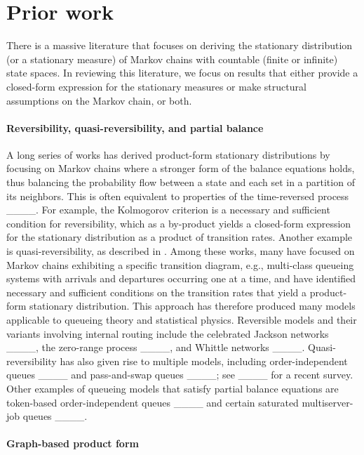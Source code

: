\section{Prior work}
\label{sec:prior-work}

There is a massive literature that focuses on deriving
the stationary distribution (or a stationary measure)
of Markov chains with countable
(finite or infinite) state spaces.
In reviewing this literature, we focus on results that
either provide a closed-form expression for the stationary measures
or make structural assumptions on the Markov chain,
or both.

\paragraph*{Reversibility, quasi-reversibility, and partial balance}

A long series of works has derived product-form stationary distributions
by focusing on Markov chains
where a stronger form of the balance equations holds,
thus balancing the probability flow between a state and each set
in a partition of its neighbors.
This is often equivalent to
properties of the time-reversed process ____.
For example, the Kolmogorov criterion \cite[Theorem~2.8]{serfozo}
is a necessary and sufficient condition for reversibility,
which as a by-product yields a closed-form expression for the stationary distribution
as a product of transition rates.
Another example is quasi-reversibility,
as described in \cite[Chapter~3]{kelly}.
Among these works, many have focused on Markov chains
exhibiting a specific transition diagram,
e.g., multi-class queueing systems with arrivals and departures occurring one at a time,
and have identified necessary and sufficient conditions
on the transition rates
that yield a product-form stationary distribution.
This approach has therefore produced many models
applicable to queueing theory and statistical physics.
Reversible models and their variants involving internal routing include
the celebrated Jackson networks ____,
the zero-range process ____,
and Whittle networks ____.
Quasi-reversibility has also given rise to multiple models,
including order-independent queues ____
and pass-and-swap queues ____; see ____ for a recent survey.
Other examples of queueing models
that satisfy partial balance equations are
token-based order-independent queues ____
and certain saturated multiserver-job queues ____.



\paragraph*{Graph-based product form}

